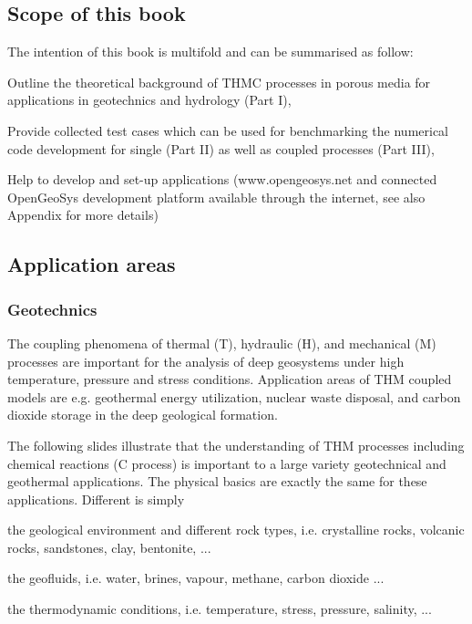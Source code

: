\subsection*{Scope of this book}

The intention of this book is multifold and can be summarised as follow:
\begin{compactitem}
  \item Outline the theoretical background of THMC processes in porous media for applications in geotechnics and hydrology (Part I),
  \item Provide collected test cases which can be used for benchmarking the numerical code development for single (Part II) as well as coupled processes (Part III),
  \item Help to develop and set-up applications (www.opengeosys.net and connected OpenGeoSys development platform available through the internet, see also Appendix for more details)
\end{compactitem}

\subsection*{Application areas}

\subsubsection{Geotechnics}

The coupling phenomena of thermal (T), hydraulic (H), and mechanical (M) processes are important for the analysis of deep geosystems under high temperature, pressure and stress conditions. Application areas of THM coupled models are e.g. geothermal energy utilization, nuclear waste disposal, and carbon dioxide storage in the deep geological formation.

The following slides illustrate that the understanding of THM processes including chemical reactions (C process) is important to a large variety geotechnical and geothermal applications. The physical basics are exactly the same for these applications. Different is simply

\begin{compactitem}
	\item the geological environment and different rock types, i.e. crystalline rocks, volcanic rocks, sandstones, clay, bentonite, ...
	\item the geofluids, i.e. water, brines, vapour, methane, carbon dioxide ...
	\item the thermodynamic conditions, i.e. temperature, stress, pressure, salinity, ...
\end{compactitem}

